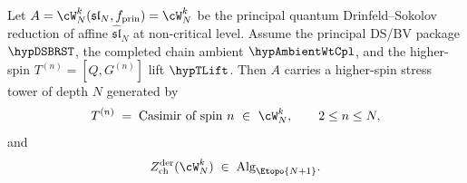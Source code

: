 \begin{theorem}
\label{thm:e-infinity-specialisation-WN}
Let $A = \cW_N^k(\mathfrak{sl}_N, f_{\mathrm{prin}}) = \cW_N^k$ be the
principal quantum Drinfeld--Sokolov reduction of affine
$\widehat{\mathfrak{sl}}_N$ at non-critical level. Assume the principal
DS/BV package \(\hypDSBRST\), the completed chain ambient
\(\hypAmbientWtCpl\), and the higher-spin \(T^{(n)}=[Q,G^{(n)}]\) lift
\(\hypTLift\). Then $A$ carries a higher-spin stress tower of depth $N$
generated by
\begin{equation}\label{eq:wn-stress-tower}
T^{(n)} \;=\; \text{Casimir of spin $n$}\ \in\ \cW_N^k,
\qquad 2 \le n \le N,
\end{equation}
and
\begin{equation}\label{eq:wn-E-Nplus1-top}
Z^{\mathrm{der}}_{\mathrm{ch}}(\cW_N^k) \;\in\;
\mathrm{Alg}_{\Etopo{N+1}}.
\end{equation}
\end{theorem}

